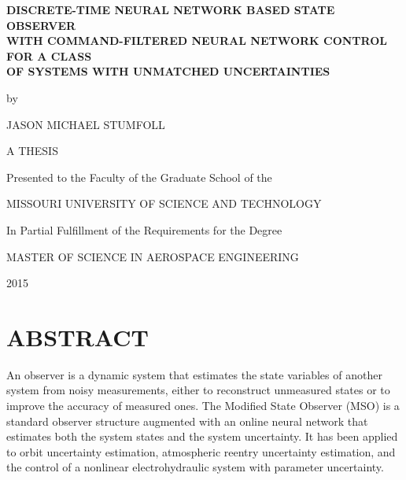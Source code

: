 \setcounter{page}{1}

\thispagestyle{empty}
\begin{center}
\singlespacing
\vspace*{0.5in}

{\large\bfseries
DISCRETE-TIME NEURAL NETWORK BASED STATE OBSERVER\\[0.4em]
WITH COMMAND-FILTERED NEURAL NETWORK CONTROL FOR A CLASS\\[0.4em]
OF SYSTEMS WITH UNMATCHED UNCERTAINTIES}

\vspace{0.8in}
by
\vspace{0.4in}

JASON MICHAEL STUMFOLL

\vspace{0.8in}
A THESIS
\vspace{0.4in}

Presented to the Faculty of the Graduate School of the

\vspace{0.3in}
MISSOURI UNIVERSITY OF SCIENCE AND TECHNOLOGY

\vspace{0.4in}
In Partial Fulfillment of the Requirements for the Degree

\vspace{0.5in}
MASTER OF SCIENCE IN AEROSPACE ENGINEERING

\vspace{0.5in}
2015

\vfill
\end{center}
\doublespacing
\clearpage

\chapter*{ABSTRACT}

An observer is a dynamic system that estimates the state variables of another
system from noisy measurements, either to reconstruct unmeasured states or to
improve the accuracy of measured ones. The Modified State Observer (MSO) is a
standard observer structure augmented with an online neural network that
estimates both the system states and the system uncertainty. It has been applied
to orbit uncertainty estimation, atmospheric reentry uncertainty estimation, and
the control of a nonlinear electrohydraulic system with parameter uncertainty.

